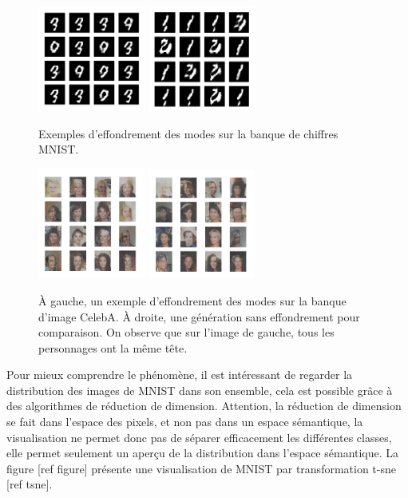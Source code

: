 \begin{figure}[!h]
\centering
\includegraphics[width=100pt]{"images/collapseA_1"}
\includegraphics[width=100pt]{"images/collapseA_2"}
\caption{Exemples d’effondrement des modes sur la banque de chiffres MNIST.}
\end{figure}

\begin{figure}[!h]
\centering
\includegraphics[width=100pt]{"images/collapseB_1"}
\includegraphics[width=100pt]{"images/collapseB_2"}
\caption{À gauche, un exemple d'effondrement des modes sur la banque d'image CelebA. À droite, une génération sans effondrement pour comparaison. On observe que sur l'image de gauche, tous les personnages ont la même tête.}
\end{figure}




Pour mieux comprendre le phénomène, il est intéressant de regarder la distribution des images de MNIST dans son ensemble, cela est possible grâce à des algorithmes de réduction de dimension. Attention, la réduction de dimension se fait dans l'espace des pixels, et non pas dans un espace sémantique, la visualisation ne permet donc pas de séparer efficacement les différentes classes, elle permet seulement un aperçu de la distribution dans l'espace sémantique. La figure [ref figure] présente une visualisation de MNIST par transformation t-sne [ref tsne].

